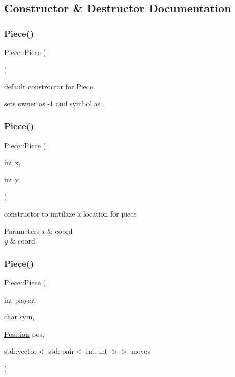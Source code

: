 \subsection{Constructor \& Destructor Documentation}
\mbox{\label{class_piece_ac57de5803bbad829b143bc7268267dc1}} 
\subsubsection{\texorpdfstring{Piece()}{Piece()}\hspace{0.1cm}{\footnotesize\ttfamily [1/3]}}
{\footnotesize\ttfamily Piece\+::\+Piece (\begin{DoxyParamCaption}{ }\end{DoxyParamCaption})}



default constroctor for \hyperlink{class_piece}{Piece} 

sets owner as -\/1 and symbol as . \mbox{\label{class_piece_af1d9eb7f67a06fd1dec6c990c95b5801}} 
\subsubsection{\texorpdfstring{Piece()}{Piece()}\hspace{0.1cm}{\footnotesize\ttfamily [2/3]}}
{\footnotesize\ttfamily Piece\+::\+Piece (\begin{DoxyParamCaption}\item[{int}]{x,  }\item[{int}]{y }\end{DoxyParamCaption})}



constructor to initilaze a location for piece 


\begin{DoxyParams}{Parameters}
{\em x} & coord \\
\hline
{\em y} & coord \\
\hline
\end{DoxyParams}
\mbox{\label{class_piece_a14670dac899c8c3ea9efe5e11a87fd85}} 
\subsubsection{\texorpdfstring{Piece()}{Piece()}\hspace{0.1cm}{\footnotesize\ttfamily [3/3]}}
{\footnotesize\ttfamily Piece\+::\+Piece (\begin{DoxyParamCaption}\item[{int}]{player,  }\item[{char}]{sym,  }\item[{\hyperlink{struct_position}{Position}}]{pos,  }\item[{std\+::vector$<$ std\+::pair$<$ int, int $>$$>$}]{moves }\end{DoxyParamCaption})}



